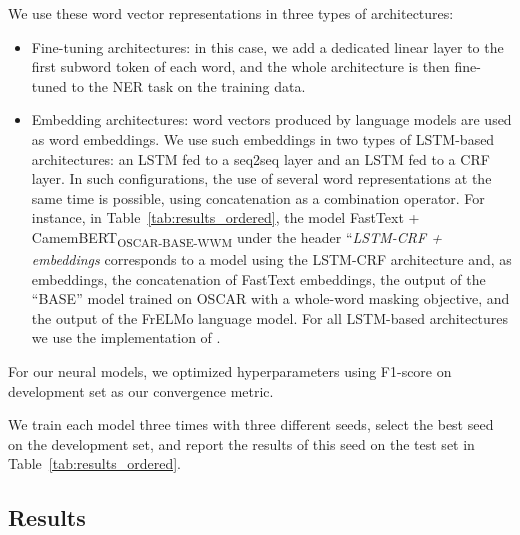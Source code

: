 We use these word vector representations in three types of architectures:
\begin{itemize}
    \item Fine-tuning architectures: in this case, we add a dedicated linear layer to the first subword token of each word, and the whole architecture is then fine-tuned to the NER task on the training data.
    \item Embedding architectures: word vectors produced by language models are used as word embeddings. We use such embeddings in two types of LSTM-based architectures: an LSTM fed to a seq2seq layer and an LSTM fed to a CRF layer. In such configurations, the use of several word representations at the same time is possible, using concatenation as a combination operator. For instance, in Table~\ref{tab:results_ordered}, the model FastText + CamemBERT\textsubscript{OSCAR-BASE-WWM} under the header ``\emph{LSTM-CRF + embeddings} corresponds to a model using the LSTM-CRF architecture and, as embeddings, the concatenation of FastText embeddings, the output of the \camembert ``BASE'' model trained on OSCAR with a whole-word masking objective, and the output of the FrELMo language model. For all LSTM-based architectures we use the implementation of \citet{strakova-etal-2019-neural}.
\end{itemize}

For our neural models, we optimized hyperparameters using F1-score on development set as our convergence metric.

We train each model three times with three different seeds, select the best seed on the development set, and report the results of this seed on the test set in Table~\ref{tab:results_ordered}.

\subsection{Results}

